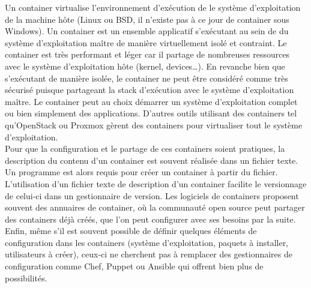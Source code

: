         Un container virtualise l'environnement d'exécution de le système d'exploitation de la machine hôte (Linux ou BSD, il n'existe pas à ce jour de container sous Windows). Un container est un ensemble applicatif s'exécutant au sein de du système d'exploitation maître de manière virtuellement isolé et contraint. Le container est très performant et léger car il partage de nombreuses ressources avec le système d'exploitation hôte (kernel, devices\dots). En revanche bien que s'exécutant de manière isolée, le container ne peut être considéré comme très sécurisé puisque partageant la stack d'exécution avec le système d'exploitation maître. Le container peut au choix démarrer un système d'exploitation complet ou bien simplement des applications. D'autres outils utilisant des containers tel qu'OpenStack ou Proxmox gèrent des containers pour virtualiser tout le système d'exploitation.\\

        Pour que la configuration et le partage de ces containers soient pratiques, la description du contenu d'un container est souvent réalisée dans un fichier texte. Un programme est alors requis pour créer un container à partir du fichier. L'utilisation d'un fichier texte de description d'un container facilite le versionnage de celui-ci dans un gestionnaire de version. Les logiciels de containers proposent souvent des annuaires de container, où la communauté open source peut partager des containers déjà créés, que l'on peut configurer avec ses besoins par la suite.\\

        Enfin, même s'il est souvent possible de définir quelques éléments de configuration dans les containers (système d'exploitation, paquets à installer, utilisateurs à créer), ceux-ci ne cherchent pas à remplacer des gestionnaires de configuration comme Chef, Puppet ou Ansible qui offrent bien plus de possibilités.
